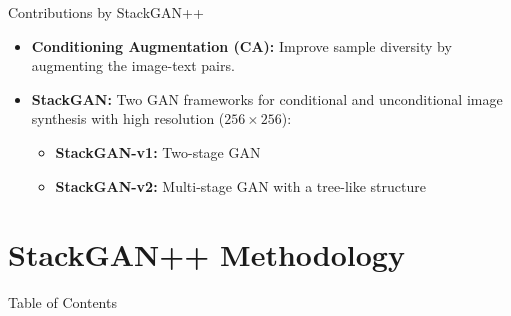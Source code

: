 \documentclass{beamer}
\begin{document}



\begin{frame}{Contributions by StackGAN++}
    \begin{itemize}
        \item \textbf{Conditioning Augmentation (CA):} Improve sample diversity by augmenting the image-text pairs.
        \vspace{1em}
        \item \textbf{StackGAN:} Two GAN frameworks for conditional and unconditional image synthesis with high resolution ($256 \times 256$):
        \vspace{0.5em}
        \begin{itemize}
            \item \textbf{StackGAN-v1:} Two-stage GAN
            \vspace{0.25em}
            \item \textbf{StackGAN-v2:} Multi-stage GAN with a tree-like structure
        \end{itemize}
    \end{itemize}
\end{frame}

\section{StackGAN++ Methodology}
\begin{frame}{Table of Contents}
    \tableofcontents[currentsection]
\end{frame}
\end{document}

